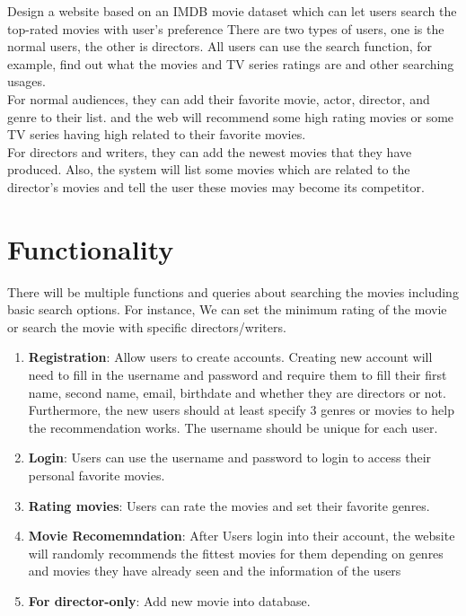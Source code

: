 \documentclass[11pt]{article}
\begin{document}
Design a website based on an IMDB movie dataset 
which can let users search the top-rated movies with user's preference 
There are two types of users, one is the normal users, the other is directors. All users can use the search function, for example, find out what the movies and TV series ratings are and other searching usages. \\
For normal audiences, they can add their favorite movie, actor, director, and genre to their list. and the web will recommend some high rating movies or some TV series having high related to their favorite movies.\\
For directors and writers, they can add the newest movies that they have produced. Also, the system will list some movies which are related to the director's movies and tell the user these movies may become its competitor.
\section{Functionality}
There will be multiple functions and queries about searching the movies including basic search options. 
For instance, We can set the minimum rating of the movie or search the movie with specific 
directors/writers. \\
\begin{enumerate}
    \item \textbf{Registration}: Allow users to create accounts. Creating new account will need to fill in the username and password 
    and require them to fill their first name, second name, email, birthdate and whether they are directors or not. 
    Furthermore, the new users should at least specify 3 genres or movies to 
    help the recommendation works. The username should be unique for each user.\\
    \item \textbf{Login}: Users can use the username and password to login to access their personal favorite movies.\\
    \item \textbf{Rating movies}: Users can rate the movies and set their favorite genres.\\
    \item \textbf{Movie Recomemndation}: After Users login into their account, the website will randomly 
    recommends the fittest movies for them depending on genres and movies they have already seen and the information of the users \\
    \item \textbf{For director-only}: Add new movie into database.
\end{enumerate}
\end{document}
